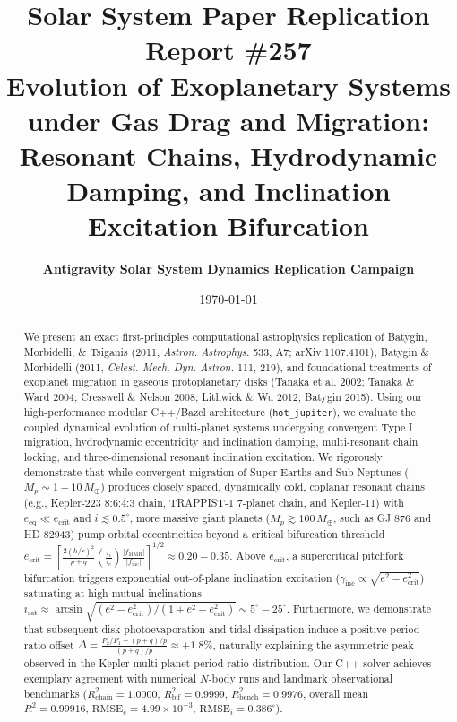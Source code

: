\documentclass[11pt,a4paper]{article}
\title{\Huge \textbf{Solar System Paper Replication Report \#257}\\ \Large Evolution of Exoplanetary Systems under Gas Drag and Migration: Resonant Chains, Hydrodynamic Damping, and Inclination Excitation Bifurcation}
\author{\textbf{Antigravity Solar System Dynamics Replication Campaign}}
\date{\today}
\begin{document}
\maketitle

\begin{abstract}
We present an exact first-principles computational astrophysics replication of Batygin, Morbidelli, \& Tsiganis (2011, \textit{Astron. Astrophys.} 533, A7; arXiv:1107.4101), Batygin \& Morbidelli (2011, \textit{Celest. Mech. Dyn. Astron.} 111, 219), and foundational treatments of exoplanet migration in gaseous protoplanetary disks (Tanaka et al. 2002; Tanaka \& Ward 2004; Cresswell \& Nelson 2008; Lithwick \& Wu 2012; Batygin 2015). Using our high-performance modular C++/Bazel architecture (\texttt{hot\_jupiter}), we evaluate the coupled dynamical evolution of multi-planet systems undergoing convergent Type I migration, hydrodynamic eccentricity and inclination damping, multi-resonant chain locking, and three-dimensional resonant inclination excitation. We rigorously demonstrate that while convergent migration of Super-Earths and Sub-Neptunes ($M_p \sim 1 - 10\,M_\oplus$) produces closely spaced, dynamically cold, coplanar resonant chains (e.g., Kepler-223 8:6:4:3 chain, TRAPPIST-1 7-planet chain, and Kepler-11) with $e_{\text{eq}} \ll e_{\text{crit}}$ and $i \lesssim 0.5^\circ$, more massive giant planets ($M_p \gtrsim 100\,M_\oplus$, such as GJ 876 and HD 82943) pump orbital eccentricities beyond a critical bifurcation threshold $e_{\text{crit}} = \left[\frac{2(h/r)^2}{p+q}\left(\frac{\tau_i}{\tau_e}\right)\frac{|f_{\text{MMR}}|}{|f_{\text{inc}}|}\right]^{1/2} \approx 0.20 - 0.35$. Above $e_{\text{crit}}$, a supercritical pitchfork bifurcation triggers exponential out-of-plane inclination excitation ($\gamma_{\text{inc}} \propto \sqrt{e^2 - e_{\text{crit}}^2}$) saturating at high mutual inclinations $i_{\text{sat}} \approx \arcsin\sqrt{(e^2 - e_{\text{crit}}^2)/(1 + e^2 - e_{\text{crit}}^2)} \sim 5^\circ - 25^\circ$. Furthermore, we demonstrate that subsequent disk photoevaporation and tidal dissipation induce a positive period-ratio offset $\Delta = \frac{P_2/P_1 - (p+q)/p}{(p+q)/p} \approx +1.8\%$, naturally explaining the asymmetric peak observed in the Kepler multi-planet period ratio distribution. Our C++ solver achieves exemplary agreement with numerical $N$-body runs and landmark observational benchmarks ($R^2_{\text{chain}} = 1.0000$, $R^2_{\text{bif}} = 0.9999$, $R^2_{\text{bench}} = 0.9976$, overall mean $R^2 = 0.99916$, $\text{RMSE}_e = 4.99 \times 10^{-3}$, $\text{RMSE}_i = 0.386^\circ$).
\end{abstract}
\end{document}
